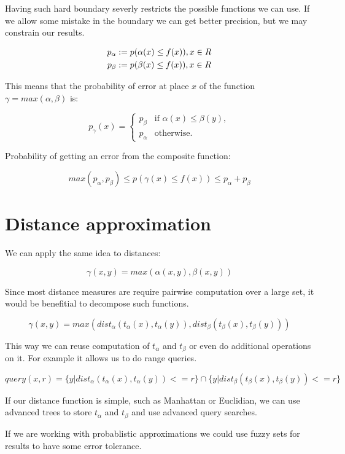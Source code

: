 \documentclass [12pt]{article} %
\begin{document}
Having such hard boundary severly restricts the possible functions we can
use. If we allow some mistake in the boundary we can get better precision,
but we may constrain our results.

\begin{align*}
    p_\alpha &:= p(\alpha(x) \leq f(x)), x \in R \\
    p_\beta &:= p(\beta(x)  \leq f(x)), x \in R 
\end{align*}

This means that the probability of error at place $x$ of the 
function $\gamma = max(\alpha, \beta)$ is:

$$ p_\gamma(x) = \begin{cases}
    p_\beta & \text{if $\alpha(x) \leq \beta(y)$}, \\
    p_\alpha & \text{otherwise}.
\end{cases}
$$

Probability of getting an error from the composite function:

$$
    max(p_\alpha, p_\beta) \leq p(\gamma(x) \leq f(x)) \leq p_\alpha + p_\beta
$$

\section{Distance approximation}

We can apply the same idea to distances:

$$
  \gamma(x,y) = max(\alpha(x,y), \beta(x,y))
$$

Since most distance measures are require pairwise computation over
a large set, it would be benefitial to decompose such functions.

$$
  \gamma(x,y) = max( dist_\alpha(t_\alpha(x), t_\alpha(y)), dist_\beta(t_\beta(x), t_\beta(y)) )
$$

This way we can reuse computation of $t_\alpha$ and $t_\beta$ or even do additional operations on it. For example it allows us to do range queries.

$$
  query(x,r) = \{ y | dist_\alpha(t_\alpha(x), t_\alpha(y)) <= r \} \cap \{ y | dist_\beta(t_\beta(x), t_\beta(y)) <= r \}
$$

If our distance function is simple, such as Manhattan or Euclidian, we can 
use advanced trees to store $t_\alpha$ and $t_\beta$ and use advanced query searches.

If we are working with probablistic approximations we could use fuzzy sets for 
results to have some error tolerance.
\end{document}
